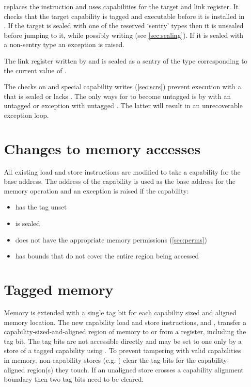  replaces the  instruction and uses capabilities for the target and link register.
It checks that the target capability is tagged and executable before it is installed in \PCC{}.
If the target is sealed with one of the reserved `sentry' types then it is unsealed before jumping to it, while possibly writing  (see \cref{sec:sealing}).
If it is sealed with a non-sentry type an exception is raised.

The link register written by  and  is sealed as a sentry of the type corresponding to the current value of .

The checks on  and special capability writes (\cref{sec:scrs}) prevent execution with a \PCC{} that is sealed or lacks \cappermX{}.
The only ways for \PCC{} to become untagged is by  with an untagged \MEPCC{} or exception with untagged \MTCC{}.
The latter will result in an unrecoverable exception loop.

\section{Changes to memory accesses}

All existing load and store instructions are modified to take a capability for the base address.
The address of the capability is used as the base address for the memory operation and an exception is raised if the capability:

\begin{itemize}
  \item has the tag unset
  \item is sealed
  \item does not have the appropriate memory permissions (\cref{sec:perms})
  \item has bounds that do not cover the entire region being accessed
\end{itemize}

\section{Tagged memory}

Memory is extended with a single tag bit for each capability sized and aligned memory location.
The new capability load and store instructions,  and , transfer a capability-sized-and-aligned region of memory to or from a register, including the tag bit.
The tag bits are not accessible directly and may be set to one only by a store of a tagged capability using .
To prevent tampering with valid capabilities in memory, non-capability stores (e.g. ) clear the tag bits for the capability-aligned region(s) they touch.
If an unaligned store crosses a capability alignment boundary then two tag bits need to be cleared.

